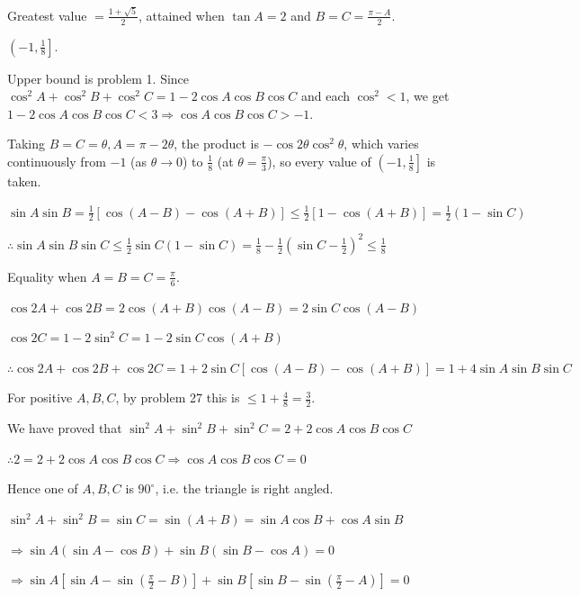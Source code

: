   Greatest value $= \frac{1 + \sqrt{5}}{2}$, attained when $\tan A = 2$ and $B = C = \frac{\pi - A}{2}$.

\item $\left(-1, \frac{1}{8}\right]$.

  Upper bound is problem 1. Since $\cos^2A + \cos^2B + \cos^2C = 1 - 2\cos A\cos B\cos C$ and each $\cos^2 < 1$, we get
  $1 - 2\cos A\cos B\cos C < 3 \Rightarrow \cos A\cos B\cos C > -1$.

  Taking $B = C = \theta, A = \pi - 2\theta$, the product is $-\cos 2\theta\cos^2\theta$, which varies continuously from
  $-1$ (as $\theta \to 0$) to $\frac{1}{8}$ (at $\theta = \frac{\pi}{3}$), so every value of $\left(-1,
  \frac{1}{8}\right]$ is taken.

\item $\sin A\sin B = \frac{1}{2}[\cos(A - B) - \cos(A + B)] \leq \frac{1}{2}[1 - \cos(A + B)] = \frac{1}{2}(1 - \sin
  C)$

  $\therefore \sin A\sin B\sin C \leq \frac{1}{2}\sin C(1 - \sin C) = \frac{1}{8} - \frac{1}{2}\left(\sin C -
  \frac{1}{2}\right)^2 \leq \frac{1}{8}$

  Equality when $A = B = C = \frac{\pi}{6}$.

\item $\cos 2A + \cos 2B = 2\cos(A + B)\cos(A - B) = 2\sin C\cos(A - B)$

  $\cos 2C = 1 - 2\sin^2C = 1 - 2\sin C\cos(A + B)$

  $\therefore \cos 2A + \cos 2B + \cos 2C = 1 + 2\sin C[\cos(A - B) - \cos(A + B)] = 1 + 4\sin A\sin B\sin C$

  For positive $A, B, C$, by problem 27 this is $\leq 1 + \frac{4}{8} = \frac{3}{2}$.

\item We have proved that $\sin^2A + \sin^2B + \sin^2C = 2 + 2\cos A\cos B\cos C$

  $\therefore 2 = 2 + 2\cos A\cos B\cos C \Rightarrow \cos A\cos B\cos C = 0$

  Hence one of $A, B, C$ is $90^\circ$, i.e. the triangle is right angled.

\item $\sin^2A + \sin^2B = \sin C = \sin(A + B) = \sin A\cos B + \cos A\sin B$

  $\Rightarrow \sin A(\sin A - \cos B) + \sin B(\sin B - \cos A) = 0$

  $\Rightarrow \sin A\left[\sin A - \sin\left(\frac{\pi}{2} - B\right)\right] + \sin B\left[\sin B -
  \sin\left(\frac{\pi}{2} - A\right)\right] = 0$

